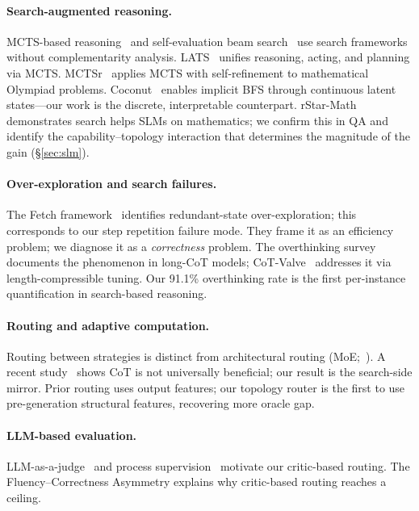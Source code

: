 \documentclass{article}
\begin{document}
\paragraph{Search-augmented reasoning.}
MCTS-based reasoning~\citep{hao2023reasoning} and self-evaluation beam
search~\citep{xie2024self} use search frameworks without complementarity
analysis.  LATS~\citep{zhou2024language} unifies reasoning, acting, and
planning via MCTS.  MCTSr~\citep{zhang2024accessing} applies MCTS with
self-refinement to mathematical Olympiad problems.
Coconut~\citep{hao2024training} enables implicit BFS through continuous
latent states---our work is the discrete, interpretable counterpart.
rStar-Math~\citep{guan2025rstar} demonstrates search helps SLMs on
mathematics; we confirm this in QA and identify the capability--topology
interaction that determines the magnitude of the gain (\S\ref{sec:slm}).

\paragraph{Over-exploration and search failures.}
The Fetch framework~\citep{zhang2025streamlined} identifies redundant-state
over-exploration; this corresponds to our step repetition failure mode.  They
frame it as an efficiency problem; we diagnose it as a \emph{correctness}
problem.  The overthinking survey~\citep{zhang2025survey} documents the
phenomenon in long-CoT models; CoT-Valve~\citep{ma2025cotvalve} addresses it
via length-compressible tuning.  Our 91.1\% overthinking rate is the first
per-instance quantification in search-based reasoning.

\paragraph{Routing and adaptive computation.}
Routing between strategies is distinct from architectural routing
(MoE;~\citealt{shazeer2017outrageously}).  A recent
study~\citep{meincke2025decreasing} shows CoT is not universally beneficial;
our result is the search-side mirror.  Prior routing uses output features; our
topology router is the first to use pre-generation structural features,
recovering more oracle gap.

\paragraph{LLM-based evaluation.}
LLM-as-a-judge~\citep{zheng2023judging} and process
supervision~\citep{lightman2023lets} motivate our critic-based routing.  The
Fluency--Correctness Asymmetry explains why critic-based routing reaches a
ceiling.
\end{document}
